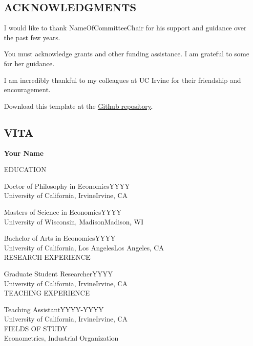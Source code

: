 \documentclass[letterpaper]{report}
\renewcommand*\listfigurename{LIST OF FIGURES}
\renewcommand*\listtablename{LIST OF TABLES}
\begin{document}

\clearpage
\onehalfspacing
\begin{center}
  \section*{ACKNOWLEDGMENTS}
\end{center}

I would like to thank NameOfCommitteeChair for his support and guidance over the past few years. \lipsum[69]

You must acknowledge grants and other funding assistance. I am grateful to some for her guidance. \lipsum[71]

I am incredibly thankful to my colleagues at UC Irvine for their friendship and encouragement. \lipsum[72]

Download this template at the \href{https://github.com/howardhsumail/Dissertation-LaTeX-Template.git}{Github repository}. \lipsum[75]

\clearpage
\onehalfspacing
\begin{center}
  \section*{VITA}
  \textbf{Your Name}
\end{center}
\vspace*{2.25em}
{\parindent0pt
EDUCATION

Doctor of Philosophy in Economics\hfill YYYY\\[-0.1cm]
University of California, Irvine\hfill Irvine, CA

Masters of Science in Economics\hfill YYYY\\[-0.1cm]
University of Wisconsin, Madison\hfill Madison, WI

Bachelor of Arts in Economics\hfill YYYY\\[-0.1cm]
University of California, Los Angeles\hfill Los Angeles, CA\\

RESEARCH EXPERIENCE

Graduate Student Researcher\hfill YYYY\\[-0.1cm]
University of California, Irvine\hfill Irvine, CA\\

TEACHING EXPERIENCE

Teaching Assistant\hfill YYYY-YYYY\\[-0.1cm]
University of California, Irvine\hfill Irvine, CA\\

FIELDS OF STUDY\\
Econometrics, Industrial Organization}
\end{document}
